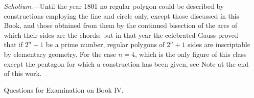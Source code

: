 \documentclass[oneside]{book}
\newcommand\exhead[1]{
\Needspace*{5\baselineskip}\begin{center}
\textsf{#1}
\end{center}
}
\begin{document}
\begin{footnotesize}
\textit{Scholium}.---Until the year 1801 no regular polygon could be
described by constructions employing the line and circle only,
except those discussed in this Book, and those obtained from
them by the continued bisection of the arcs of which their sides
are the chords; but in that year the celebrated Gauss proved that
if $2^n+1$ be a prime number, regular polygons of $2^n+1$ sides are
inscriptable by elementary geometry. For the case $n=4$, which
is the only figure of this class except the pentagon for which
a construction has been given, see Note at the end of this work.
\par\end{footnotesize}

\exhead{Questions for Examination on Book IV\@.}
\end{document}
